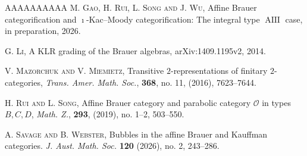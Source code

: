 \documentclass[a4,10pt]{amsart}
\numberwithin{equation}{section}
\theoremstyle{definition}
\begin{document}
\begin{thebibliography}{AAAAAAAAAA}
 {\scshape M. Gao, H. Rui,  L. Song and J. Wu}, Affine Brauer categorification and $\imath$-Kac--Moody categorification: The integral type $\operatorname{AIII}$ case, in preparation, 2026.

 {\scshape G. Li}, 
A KLR grading of the Brauer algebras,  arXiv:1409.1195v2, 2014.

 {\scshape  V. Mazorchuk and V. Miemietz}, Transitive \(2\)-representations of finitary
             \(2\)-categories, {\it Trans. Amer. Math. Soc.}, {\bf 368}, no. 11, (2016), 7623--7644. 
  



 {\scshape H. Rui and  L. Song}, Affine Brauer category and parabolic category $\mathcal O$ in types $B, C, D$, {\it Math. Z.}, {\bf 293}, (2019), no. 1--2, 503--550.



  {\scshape A. Savage and B. Webster},  Bubbles in the affine Brauer and Kauffman categories. {\it J. Aust. Math. Soc.} \textbf{120}  (2026), no. 2, 243–286.

\end{thebibliography}
\end{document}
